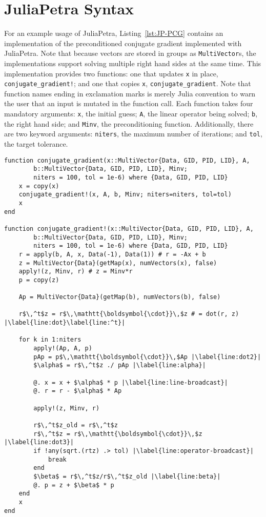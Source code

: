 \documentclass[acmsmall]{acmart}
\newcommand{\snippet}[1]{\lstinline[mathescape]{#1}}
\begin{document}
	\section{JuliaPetra Syntax}
	
	For an example usage of JuliaPetra, Listing~\ref{lst:JP-PCG} contains an implementation of the preconditioned conjugate gradient implemented with JuliaPetra.
	Note that because vectors are stored in groups as \snippet{MultiVector}s, the implementations support solving multiple right hand sides at the same time.
	This implementation provides two functions: one that updates \snippet{x} in place, \snippet{conjugate_gradient!}; and one that copies \snippet{x}, \snippet{conjugate_gradient}.
	Note that function names ending in exclamation marks is merely Julia convention to warn the user that an input is mutated in the function call.
	Each function takes four mandatory arguments: \snippet{x}, the initial guess; \snippet{A}, the linear operator being solved; \snippet{b}, the right hand side; and \snippet{Minv}, the preconditioning function.
	Additionally, there are two keyword arguments: \snippet{niters}, the maximum number of iterations; and \snippet{tol}, the target tolerance.
	
	\begin{lstlisting}[float,
						caption=Preconditioned Conjugate Gradient in JuliaPetra,
						label=lst:JP-PCG,
						escapechar=|]
function conjugate_gradient(x::MultiVector{Data, GID, PID, LID}, A,
        b::MultiVector{Data, GID, PID, LID}, Minv;
        niters = 100, tol = 1e-6) where {Data, GID, PID, LID}
    x = copy(x)
    conjugate_gradient!(x, A, b, Minv; niters=niters, tol=tol)
    x
end

function conjugate_gradient!(x::MultiVector{Data, GID, PID, LID}, A,
        b::MultiVector{Data, GID, PID, LID}, Minv;
        niters = 100, tol = 1e-6) where {Data, GID, PID, LID}
    r = apply(b, A, x, Data(-1), Data(1)) # r = -Ax + b
    z = MultiVector{Data}(getMap(x), numVectors(x), false)
    apply!(z, Minv, r) # z = Minv*r
    p = copy(z)

    Ap = MultiVector{Data}(getMap(b), numVectors(b), false)

    r$\,^t$z = r$\,\mathtt{\boldsymbol{\cdot}}\,$z # = dot(r, z) |\label{line:dot}\label{line:^t}|

    for k in 1:niters
        apply!(Ap, A, p)
        pAp = p$\,\mathtt{\boldsymbol{\cdot}}\,$Ap |\label{line:dot2}|
        $\alpha$ = r$\,^t$z ./ pAp |\label{line:alpha}|

        @. x = x + $\alpha$ * p |\label{line:line-broadcast}|
        @. r = r - $\alpha$ * Ap

        apply!(z, Minv, r)

        r$\,^t$z_old = r$\,^t$z
        r$\,^t$z = r$\,\mathtt{\boldsymbol{\cdot}}\,$z |\label{line:dot3}|
        if !any(sqrt.(rtz) .> tol) |\label{line:operator-broadcast}|
            break
        end
        $\beta$ = r$\,^t$z/r$\,^t$z_old |\label{line:beta}|
        @. p = z + $\beta$ * p
    end
    x
end
	\end{lstlisting}
	
\end{document}
